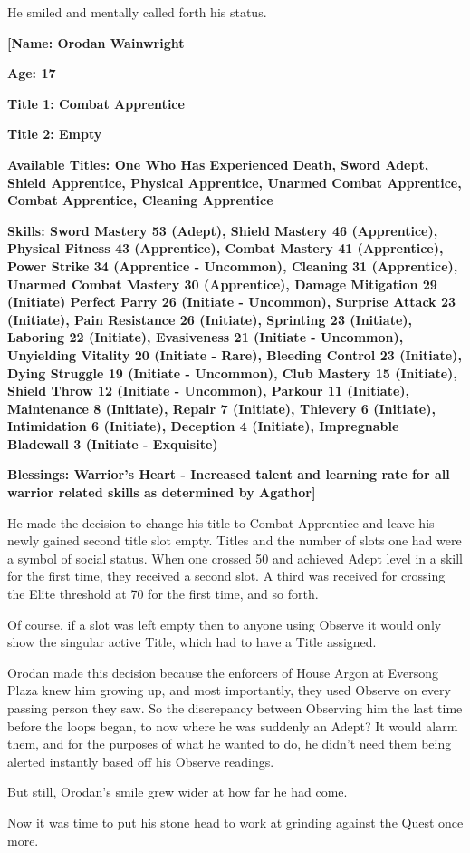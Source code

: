 \documentclass[a4paper,10pt]{book}
\begin{document}
He smiled and mentally called forth his status.\par
\textbf{[Name: Orodan Wainwright}\par
\textbf{Age: 17}\par
\textbf{Title 1: Combat Apprentice}\par
\textbf{Title 2: Empty}\par
\textbf{Available Titles: One Who Has Experienced Death, Sword Adept, Shield Apprentice, Physical Apprentice, Unarmed Combat Apprentice, Combat Apprentice, Cleaning Apprentice}\par
\textbf{Skills: Sword Mastery 53 (Adept), Shield Mastery 46 (Apprentice), Physical Fitness 43 (Apprentice), Combat Mastery 41 (Apprentice), Power Strike 34 (Apprentice - Uncommon), Cleaning 31 (Apprentice), Unarmed Combat Mastery 30 (Apprentice), Damage Mitigation 29 (Initiate) Perfect Parry 26 (Initiate - Uncommon), Surprise Attack 23 (Initiate), Pain Resistance 26 (Initiate), Sprinting 23 (Initiate), Laboring 22 (Initiate), Evasiveness 21 (Initiate - Uncommon), Unyielding Vitality 20 (Initiate - Rare), Bleeding Control 23 (Initiate), Dying Struggle 19 (Initiate - Uncommon), Club Mastery 15 (Initiate), Shield Throw 12 (Initiate - Uncommon), Parkour 11 (Initiate), Maintenance 8 (Initiate), Repair 7 (Initiate), Thievery 6 (Initiate), Intimidation 6 (Initiate), Deception 4 (Initiate), Impregnable Bladewall 3 (Initiate - Exquisite)}\par
\textbf{Blessings: Warrior’s Heart - Increased talent and learning rate for all warrior related skills as determined by Agathor]}\par
He made the decision to change his title to Combat Apprentice and leave his newly gained second title slot empty. Titles and the number of slots one had were a symbol of social status. When one crossed 50 and achieved Adept level in a skill for the first time, they received a second slot. A third was received for crossing the Elite threshold at 70 for the first time, and so forth.\par
Of course, if a slot was left empty then to anyone using Observe it would only show the singular active Title, which had to have a Title assigned.\par
Orodan made this decision because the enforcers of House Argon at Eversong Plaza knew him growing up, and most importantly, they used Observe on every passing person they saw. So the discrepancy between Observing him the last time before the loops began, to now where he was suddenly an Adept? It would alarm them, and for the purposes of what he wanted to do, he didn’t need them being alerted instantly based off his Observe readings.\par
But still, Orodan’s smile grew wider at how far he had come.\par
Now it was time to put his stone head to work at grinding against the Quest once more.\par
\end{document}
